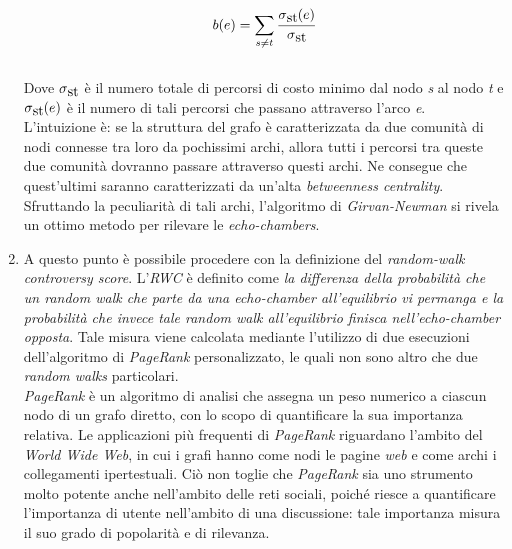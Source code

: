 \begin{enumerate}
\\
\begin{equation}b(e) = \sum_{\substack{
   s \neq t
  }} 
 \cfrac{\sigma\textsubscript{st}(e)}{\sigma\textsubscript{st}}
\end{equation}
\\ 
Dove \textit{$\sigma\textsubscript{st}$} è il numero totale di percorsi di costo minimo dal nodo \textit{s} al nodo \textit{t} e \textit{$\sigma\textsubscript{st}(e)$} è il numero di tali percorsi che passano attraverso l'arco \textit{e}. 
\\L'intuizione è: se la struttura del grafo è caratterizzata da due comunità di nodi connesse tra loro da pochissimi archi, allora tutti i percorsi tra queste due comunità dovranno passare attraverso questi archi. Ne consegue che quest'ultimi saranno caratterizzati da un'alta \textit{betweenness centrality}. Sfruttando la peculiarità di tali archi, l'algoritmo di \textit{Girvan-Newman} si rivela un ottimo metodo per rilevare le \textit{echo-chambers}.
\item A questo punto è possibile procedere con la definizione del \textit{random-walk controversy score}. L'\textit{RWC} è definito come \textit{la differenza della probabilità che un random walk che parte da una echo-chamber all'equilibrio vi permanga e la probabilità che invece tale random walk all'equilibrio finisca nell'echo-chamber opposta}. Tale misura viene calcolata mediante l'utilizzo di due esecuzioni dell'algoritmo di \textit{PageRank} personalizzato, le quali non sono altro che due \textit{random walks} particolari.\\
\textit{PageRank} è un algoritmo di analisi che assegna un peso numerico a ciascun nodo di un grafo diretto, con lo scopo di quantificare la sua importanza relativa. Le applicazioni più frequenti di \textit{PageRank} riguardano l'ambito del \textit{World Wide Web}, in cui i grafi hanno come nodi le pagine \textit{web} e come archi i collegamenti ipertestuali. Ciò non toglie che \textit{PageRank} sia uno strumento molto potente anche nell'ambito delle reti sociali, poiché riesce a quantificare l'importanza di utente nell'ambito di una discussione: tale importanza misura il suo grado di popolarità e di rilevanza.

\end{enumerate}

